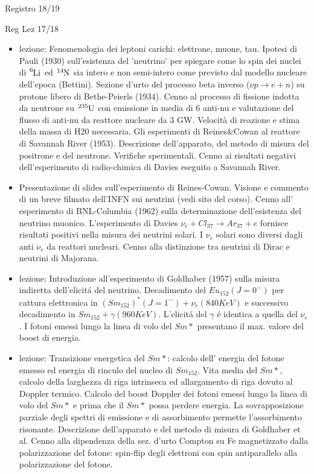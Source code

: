 \begin{frame}{Registro 18/19}
\begin{frame}[allowframebreaks]{Reg Lez 17/18}
\begin{itemize}
\item  lezione: Fenomenologia dei leptoni carichi: elettrone, muone, tau. Ipotesi di Pauli (1930) sull'esistenza del 'neutrino' per spiegare come lo spin dei nuclei di $\cel{Li}{6}{}{}$ ed $\cel{N}{14}{}{}$ sia intero e non semi-intero come previsto dal modello nucleare dell'epoca (Bettini). Sezione d'urto del processo beta inverso ($\nu p\to e+n$) su protone libero di Bethe-Peierls (1934). Cenno al processo di fissione indotta da neutrone su $\cel{U}{235}{}{}$ con emissione in media di 6 anti-nu e valutazione del flusso di anti-nu da reattore nucleare da 3 GW. Velocità di reazione e stima della massa di H20 necessaria. Gli esperimenti di Reines\&Cowan al reattore di Savannah River (1953). Descrizione dell'apparato, del metodo di misura del positrone e del neutrone. Verifiche sperimentali. Cenno ai risultati negativi dell'esperimento di radio-chimica di Davies eseguito a Savannah River.

\item  Presentazione di slides sull'esperimento di Reines-Cowan. Visione e commento di un breve filmato dell'INFN sui neutrini (vedi sito del corso). Cenno all' esperimento di BNL-Columbia (1962) sulla determinazione dell'esistenza del neutrino muonico. L'esperimento di Davies $\nu_e+Cl_{37}\to Ar_{37}+e$ fornisce risultati positivi nella misura dei neutrini solari. I $\nu_e$ solari sono diversi dagli anti $\nu_e$ da reattori nucleari. Cenno alla distinzione tra neutrini di Dirac e neutrini di Majorana.

\item  lezione: Introduzione all'esperimento di Goldhaber (1957) sulla misura indiretta dell'elicit\'a del neutrino. Decadimento del $Eu_{152}(J=0^-)$ per cattura elettronica in $(Sm_{152})^*(J=1^-)+\nu_e(840KeV)$ e successivo decadimento in $Sm_{152}+\gamma(960KeV)$. L'elicit\'a del $\gamma$ \'e identica a quella del $\nu_e$. I fotoni emessi lungo la linea di volo del $Sm*$ presentano il max. valore del boost di energia.

\item  lezione: Transizione energetica del $Sm*$: calcolo dell' energia del fotone emesso ed energia di rinculo del nucleo di $Sm_{152}$. Vita media del $Sm*$, calcolo della larghezza di riga intrinseca ed allargamento di riga dovuto al Doppler termico. Calcolo del boost Doppler dei fotoni emessi lungo la linea di volo del $Sm*$ e prima che il $Sm*$ possa perdere energia. La sovrapposizione parziale degli spettri di emissione e di assorbimento permette l'assorbimento risonante. Descrizione dell'apparato e del metodo di misura di Goldhaber et al. Cenno alla dipendenza della sez. d'urto Compton su Fe magnetizzato dalla polarizzazione del fotone: spin-flip degli elettroni con spin antiparallelo alla polarizzazione del fotone.


\end{itemize}
\end{frame}
\end{frame}
